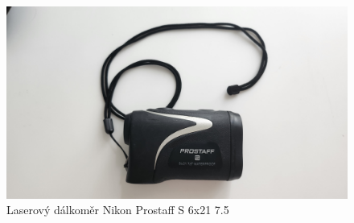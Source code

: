 \begin{figure}[h!]
    \centering
    \includegraphics[scale=0.075]{img/dalkomer.jpg}
    \caption{Laserový dálkoměr Nikon Prostaff S 6x21 7.5}
    \label{fig:my_label}
\end{figure}

